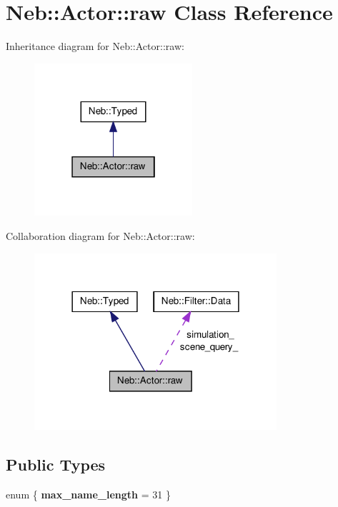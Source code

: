 \hypertarget{classNeb_1_1Actor_1_1raw}{\section{\-Neb\-:\-:\-Actor\-:\-:raw \-Class \-Reference}
\label{classNeb_1_1Actor_1_1raw}
}


\-Inheritance diagram for \-Neb\-:\-:\-Actor\-:\-:raw\-:\nopagebreak
\begin{figure}[H]
\begin{center}
\leavevmode
\includegraphics[width=166pt]{classNeb_1_1Actor_1_1raw__inherit__graph}
\end{center}
\end{figure}


\-Collaboration diagram for \-Neb\-:\-:\-Actor\-:\-:raw\-:\nopagebreak
\begin{figure}[H]
\begin{center}
\leavevmode
\includegraphics[width=254pt]{classNeb_1_1Actor_1_1raw__coll__graph}
\end{center}
\end{figure}
\subsection*{\-Public \-Types}
\begin{DoxyCompactItemize}
\item 
enum \{ {\bfseries max\-\_\-name\-\_\-length} =  31
 \}
\end{DoxyCompactItemize}
